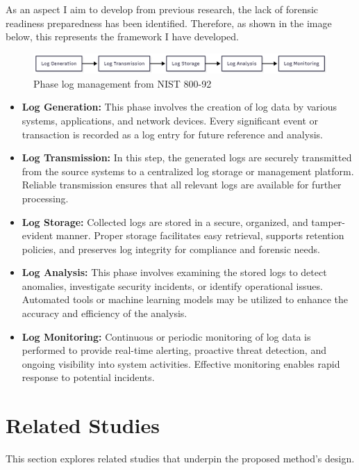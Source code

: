 As an aspect I aim to develop from previous research, the lack of forensic readiness preparedness has been identified. Therefore, as shown in the image below, this represents the framework I have developed.

\begin{figure}[H] 
    \centering
    \includegraphics[width=14cm]{figure/log-management-nist-800-92-original.png}
    \caption{ Phase log management from NIST 800-92}
    \label{fig:nist-log-management-phase}
\end{figure}


\begin{itemize}
	\item \textbf{Log Generation:} This phase involves the creation of log data by various systems, applications, and network devices. Every significant event or transaction is recorded as a log entry for future reference and analysis.
	\item \textbf{Log Transmission:} In this step, the generated logs are securely transmitted from the source systems to a centralized log storage or management platform. Reliable transmission ensures that all relevant logs are available for further processing.
	\item \textbf{Log Storage:} Collected logs are stored in a secure, organized, and tamper-evident manner. Proper storage facilitates easy retrieval, supports retention policies, and preserves log integrity for compliance and forensic needs.
	\item \textbf{Log Analysis:} This phase involves examining the stored logs to detect anomalies, investigate security incidents, or identify operational issues. Automated tools or machine learning models may be utilized to enhance the accuracy and efficiency of the analysis.
	\item \textbf{Log Monitoring:} Continuous or periodic monitoring of log data is performed to provide real-time alerting, proactive threat detection, and ongoing visibility into system activities. Effective monitoring enables rapid response to potential incidents.
\end{itemize}


\section{Related Studies}
This section explores related studies that underpin the proposed method's design.

